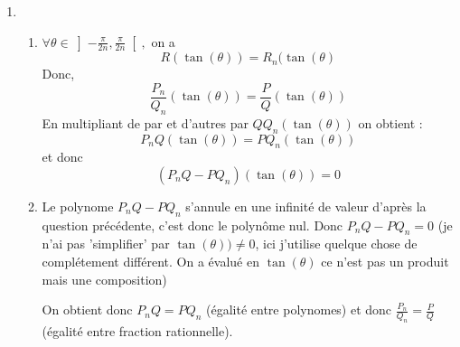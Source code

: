 \begin{correction}
\begin{enumerate}
\begin{enumerate}
\end{enumerate}
\item
\begin{enumerate}
\item $\forall  \theta \in \left] -\frac{\pi}{2n},\frac{\pi}{2n}\right[, $
on a 
$$R(\tan(\theta)) =R_n(\tan(\theta)$$
Donc, 
$$\frac{P_n}{Q_n} (\tan(\theta)) =\frac{P}{Q} (\tan(\theta))$$
En multipliant de par et d'autres par $QQ_n (\tan(\theta))$ on obtient : 
$$P_n Q (\tan(\theta))=P Q_n (\tan(\theta))$$
et donc 
$$(P_nQ -PQ_n)(\tan(\theta))=0$$
\item Le polynome $P_nQ -PQ_n$  s'annule en une infinité de valeur d'après la question précédente, c'est donc le polynôme nul. Donc 
$P_n Q - P Q_n = 0$ (je n'ai pas 'simplifier' par $\tan(\theta)) \neq 0$, ici j'utilise quelque chose de complétement différent. On a évalué en $\tan(\theta)$ ce n'est pas un produit mais une composition) 

On obtient donc $P_n Q= PQ_n$ (égalité entre polynomes) et donc 
$\frac{P_n}{Q_n} =\frac{P}{Q}$ (égalité entre fraction rationnelle). 

\end{enumerate}
\end{enumerate}
\end{correction}








